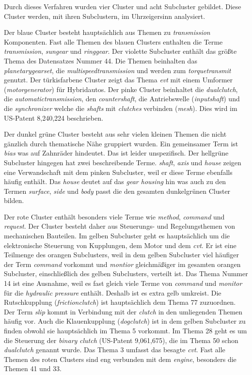  
 
Durch dieses Verfahren wurden vier Cluster und acht Subcluster gebildet. Diese Cluster werden, mit ihren Subclustern, im Uhrzeigersinn analysiert.

Der blaue Cluster besteht hauptsächlich aus Themen zu \emph{transmission} Komponenten. Fast alle Themen des blauen Clusters enthalten die Terme \emph{transmission}, \emph{sungear} und \emph{ringgear}. Der violette Subcluster enthält das größte Thema des Datensatzes Nummer 44. Die Themen beinhalten das \emph{planetarygearset}, die \emph{multispeedtransmission} und werden zum \emph{torquetransmit} genutzt. Der türkisfarbene Cluster zeigt das Thema \emph{\gls{evt}} mit einem Umformer (\emph{motorgenerator}) für Hybridautos. Der pinke Cluster beinhaltet die \emph{dualclutch}, die  \emph{automatictransmission}, den \emph{countershaft}, die Antriebswelle (\emph{inputshaft}) und die \emph{synchronizer} welche die \emph{shafts} mit \emph{clutches} verbinden (\emph{mesh}). Dies wird im US-Patent 8,240,224 beschrieben.


Der dunkel grüne Cluster besteht aus sehr vielen kleinen Themen die nicht gänzlich durch thematische Nähe gruppiert wurden. Ein gemeinsamer Term ist \emph{bias} was auf Zahnräder hindeutet. Das ist leider unspezifisch. Der hellgrüne Subcluster hingegen hat zwei beschreibende Terme. \emph{shaft}, \emph{axis} und \emph{house} zeigen eine Verwandschaft mit dem pinken Subcluster, weil er diese Terme ebenfalls häufig enthält. Das \emph{house} deutet auf das \emph{gear housing} hin was auch zu den Termen \emph{surface}, \emph{side} und \emph{body} passt die den gesamten dunkelgrünen Cluster bilden.


Der rote Cluster enthält besonders viele Terme wie \emph{method}, \emph{command} und \emph{request}. Der Cluster besteht daher aus Steuerungs- und Regelungsthemen von mechanischen Bauteilen. Im gelben Subcluster geht es hauptsächlich um die elektronische Steuerung von Kupplungen, dem Motor und dem \emph{\gls{cvt}}. Er ist eine Teilmenge des orangen Subclusters, weil in dem gelben Subcluster viel häufiger der Term \emph{command} vorkommt und \emph{montior} gleichmäßiger im gesamten orangen Subcluster, einschließlich des gelben Subclusters, verteilt ist. Das Thema Nummer 14 ist eine Ausnahme, weil es fast gleich viele Terme von \emph{command} und \emph{monitor} für die \emph{hydraulic} \emph{pressure} enthält. Deshalb ist es extra gelb umkreist. Die Rutschkupplung (\emph{frictionclutch}) ist hauptsächlich dem Thema 77 zuzuordnen. Der Term \emph{slip} kommt in Verbindung mit der \emph{clutch} in den umliegenden Themen häufig vor. Auch die Klauenkupplung (\emph{dogclutch}) ist in dem gelben Subcluster zu finden obwohl sie hauptsächlich im Thema 5 vorkommt. Im Thema 28 geht es um die Steuerung der \emph{binary} \emph{clutch} (US-Patent 9,061,675), die im Thema 50 schon \emph{dualclutch} genannt wurde. Das Thema 3 umfasst das besagte \emph{\gls{cvt}}. Fast alle Themen des roten Clusters sind eng verbunden mit dem \emph{engine}, besonders die Themen 41 und 33. 


